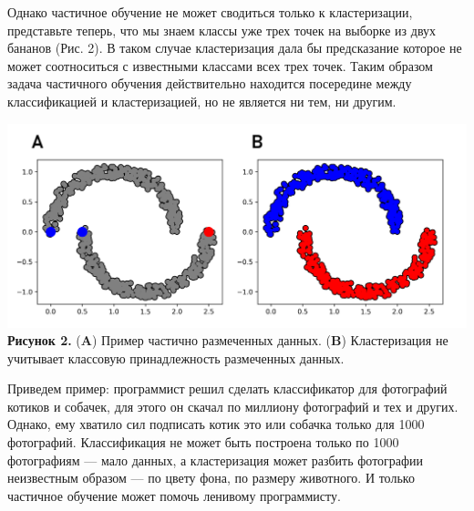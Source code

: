 Однако частичное обучение не может сводиться только к кластеризации, представьте теперь, что мы знаем классы уже трех точек на выборке из двух бананов (Рис. 2). В таком случае кластеризация дала бы предсказание которое не может соотноситься с известными классами всех трех точек. Таким образом задача частичного обучения действительно находится посередине между классификацией и кластеризацией, но не является ни тем, ни другим. \\
\begin{center}
\includegraphics[width=1.0\textwidth]{chapters/clustering/picture_2.png}
\textbf{Рисунок 2.} (\textbf{A}) Пример частично размеченных данных. (\textbf{B}) Кластеризация не учитывает классовую принадлежность размеченных данных. 
\end{center}

Приведем пример: программист решил сделать классификатор для фотографий котиков и собачек, для этого он скачал по миллиону фотографий и тех и других. Однако, ему хватило сил подписать котик это или собачка только для 1000 фотографий. Классификация не может быть построена только по 1000 фотографиям --- мало данных, а кластеризация может разбить фотографии неизвестным образом --- по цвету фона, по размеру животного. И только частичное обучение может помочь ленивому программисту.
